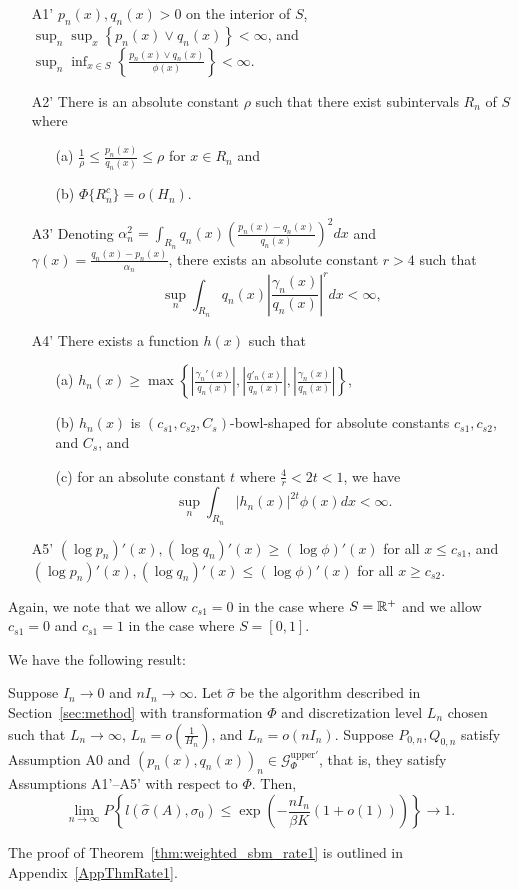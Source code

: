 \documentclass{article}
\begin{document}
\begin{enumerate}
\item[A1'] $p_n(x), q_n(x) > 0$ on the interior of $S$, $\sup_n \sup_x \left\{p_n(x) \vee q_n(x)\right\} < \infty$, and $\sup_n \inf_{x \in S} \left\{\frac{p_n(x) \vee q_n(x)}{\phi(x)}\right\} < \infty$. 
\item[A2'] There is an absolute constant $\rho$ such that there exist subintervals $R_n$ of $S$ where
\begin{itemize}
\item[(a)] $\frac{1}{\rho} \leq \frac{p_n(x)}{q_n(x)} \leq \rho$ for $x \in R_n$ and
\item[(b)] $\Phi\{R_n^c\} = o(H_n)$.
\end{itemize}
\item[A3'] Denoting $\alpha_n^2 = \int_{R_n} q_n(x) \left( \frac{p_n(x) - q_n(x)}{q_n(x)} \right)^2 dx$ and $\gamma(x) = \frac{q_n(x) - p_n(x)}{\alpha_n}$, there exists an absolute constant $r > 4$ such that
$$\sup_n \int_{R_n} q_n(x) \left| \frac{\gamma_n(x)}{q_n(x)} \right|^r dx  < \infty,$$
\item[A4'] There exists a function $h(x)$ such that
\begin{itemize}
\item[(a)] $h_n(x) \geq \max \left\{  \left|\frac{\gamma_n'(x)}{q_n(x)} \right|,  \left|\frac{q'_n(x)}{q_n(x)}\right|, \left | \frac{\gamma_n(x)}{q_n(x)} \right|  \right\} $, 
\item[(b)] $h_n(x)$ is $(c_{s1}, c_{s2}, C_s)$-bowl-shaped for absolute constants $c_{s1}, c_{s2}$, and $C_s$, and
\item[(c)] for an absolute constant $t$ where $\frac{4}{r} < 2t  < 1$, we have
$$\sup_n \int_{R_n} |h_n(x)|^{2t} \phi(x) dx < \infty.$$
\end{itemize}

\item[A5']  $(\log p_n)'(x), (\log q_n)'(x) \geq (\log \phi)'(x)$ for all $x \leq c_{s1}$, and $ (\log p_n)'(x), (\log q_n)'(x) \leq (\log \phi)'(x)$ for all $x \geq c_{s2}$.
\end{enumerate}
Again, we note that we allow $c_{s1} = 0$ in the case where $S={\mathbb R}^+$ and we allow $c_{s1} = 0$ and $c_{s1}=1$ in the case where $S = [0,1]$.

We have the following result:
\begin{theorem}
  \label{thm:weighted_sbm_rate1}
  Suppose $I_n \rightarrow 0$ and $nI_n \rightarrow \infty$. 
  Let $\hat{\sigma}$ be the algorithm described in Section~\ref{sec:method} with transformation $\Phi$ and discretization level $L_n$ chosen such that $L_n \rightarrow \infty$, $L_n = o(\frac{1}{H_n})$, and $L_n = o(nI_n)$. Suppose $P_{0,n}, Q_{0,n}$ satisfy Assumption A0 and $(p_n(x), q_n(x))_n \in \mathcal{G}^{\textrm{upper} \prime}_\Phi$, that is, they satisfy Assumptions A1'--A5' with respect to $\Phi$. Then,
\[
\lim_{n \rightarrow \infty} P \left\{
     l(\hat{\sigma}(A), \sigma_0) \leq \exp\left( - \frac{nI_n}{\beta K} (1 + o(1)) \right)
    \right\} \rightarrow 1.
\]
\end{theorem}
The proof of Theorem~\ref{thm:weighted_sbm_rate1} is outlined in Appendix~\ref{AppThmRate1}. 
\end{document}
